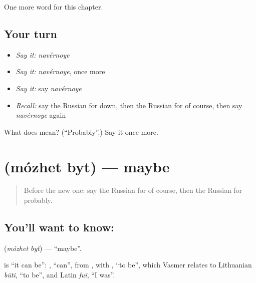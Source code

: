 \begin{grammarlens}[title={What you've built}]
One more word for this chapter.
\end{grammarlens}

\subsection*{Your turn}
\begin{itemize}
\raggedright
  \item \emph{Say it:} \emph{navérnoye}
  \item \emph{Say it:} \emph{navérnoye}, once more
  \item \emph{Say it:} say \emph{navérnoye}
  \item \emph{Recall:} say the Russian for down, then the Russian for of course, then say \emph{navérnoye} again
\end{itemize}

\begin{tcolorbox}[breakable,colback=teal!4,colframe=teal!35!black,title={Before you move on}]
What does  mean? (\textquotedblleft{}Probably\textquotedblright{}.) Say it once more.
\end{tcolorbox}
\section[\texorpdfstring{\ru{может} \ru{быть} (mózhet byt)}{может быть (mózhet byt)}]{  (mózhet byt) — maybe}

\label{lesson:RU-C215-mozhet-byt}



\begin{quote}
Before the new one: say the Russian for of course, then the Russian for probably.
\end{quote}

\subsection*{You'll want to know:  }
\textbf{ } (\emph{mózhet byt}) — \textquotedblleft{}maybe\textquotedblright{}.

\begin{cousinweb}
\textbf{ } is \textquotedblleft{}it can be\textquotedblright{}: \emph{}, \textquotedblleft{}can\textquotedblright{}, from \emph{}, with \emph{}, \textquotedblleft{}to be\textquotedblright{}, which Vasmer relates to Lithuanian \emph{būti}, \textquotedblleft{}to be\textquotedblright{}, and Latin \emph{fuī}, \textquotedblleft{}I was\textquotedblright{}.
\end{cousinweb}

